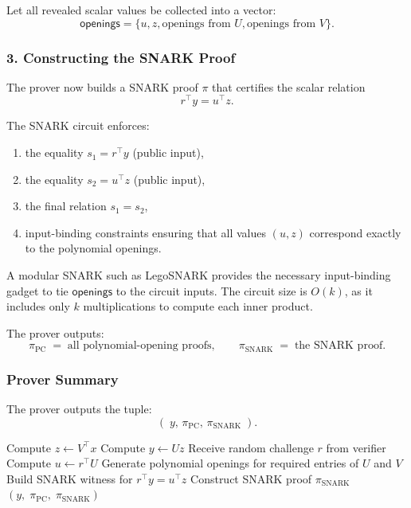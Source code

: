 \documentclass[11pt]{article}
\begin{document}
Let all revealed scalar values be collected into a vector:
\[
  \mathsf{openings} = \{u, z, \text{openings from } U, \text{openings from } V\}.
\]

\subsubsection{3. Constructing the SNARK Proof}

The prover now builds a SNARK proof $\pi$ that certifies the scalar
relation
\[
  r^\top y = u^\top z.
\]

The SNARK circuit enforces:
\begin{enumerate}
  \item the equality $s_1 = r^\top y$ (public input),
  \item the equality $s_2 = u^\top z$ (public input),
  \item the final relation $s_1 = s_2$,
  \item input-binding constraints ensuring that all values 
        $(u, z)$ correspond exactly to the polynomial openings.
\end{enumerate}

A modular SNARK such as LegoSNARK provides the necessary input-binding
gadget to tie $\mathsf{openings}$ to the circuit inputs.
The circuit size is $O(k)$, as it includes only $k$ multiplications to
compute each inner product.

The prover outputs:
\[
  \pi_{\mathrm{PC}} \;=\; \text{all polynomial-opening proofs},\qquad
  \pi_{\mathrm{SNARK}} \;=\; \text{the SNARK proof}.
\]

\subsubsection{Prover Summary}

The prover outputs the tuple:
\[
  (\; y,\, \pi_{\mathrm{PC}},\, \pi_{\mathrm{SNARK}} \;).
\]

\begin{algorithm}[t]
\caption{Prover Algorithm}
\begin{algorithmic}[1]
\State Compute $z \gets V^\top x$
\State Compute $y \gets U z$
\State Receive random challenge $r$ from verifier
\State Compute $u \gets r^\top U$
\State Generate polynomial openings for required entries of $U$ and $V$
\State Build SNARK witness for $r^\top y = u^\top z$
\State Construct SNARK proof $\pi_{\mathrm{SNARK}}$
\State \Return $(y,\; \pi_{\mathrm{PC}},\; \pi_{\mathrm{SNARK}})$
\end{algorithmic}
\end{algorithm}
\end{document}
